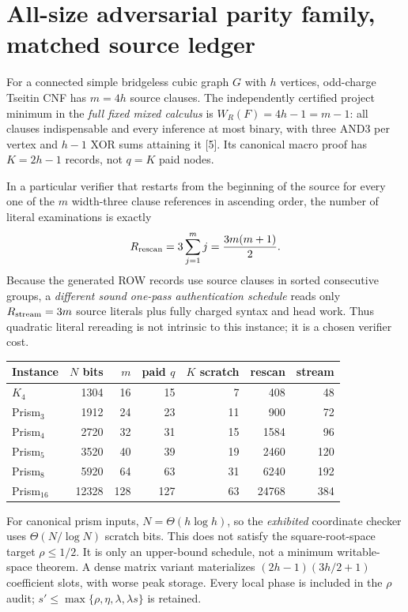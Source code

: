 \documentclass[11pt]{article}
\begin{document}
\section{All-size adversarial parity family, matched source ledger}
For a connected simple bridgeless cubic graph $G$ with $h$ vertices, odd-charge Tseitin CNF has $m=4h$ source clauses. The independently certified project minimum in the \emph{full fixed mixed calculus} is $W_R(F)=4h-1=m-1$: all clauses indispensable and every inference at most binary, with three AND3 per vertex and $h-1$ XOR sums attaining it [5]. Its canonical macro proof has $K=2h-1$ records, not $q=K$ paid nodes.

In a particular verifier that restarts from the beginning of the source for every one of the $m$ width-three clause references in ascending order, the number of literal examinations is exactly
\[
R_{\rm rescan}=3\sum_{j=1}^{m}j=\frac{3m(m+1)}2.
\]
Because the generated ROW records use source clauses in sorted consecutive groups, a \emph{different sound one-pass authentication schedule} reads only $R_{\rm stream}=3m$ source literals plus fully charged syntax and head work. Thus quadratic literal rereading is not intrinsic to this instance; it is a chosen verifier cost.

\begin{center}\small
\begin{tabular}{lrrrrrr}\toprule
Instance & $N$ bits & $m$ & paid $q$ & $K$ scratch & rescan & stream\\\midrule
$K_4$ & 1304 &16&15&7&408&48\\
Prism$_3$ &1912&24&23&11&900&72\\
Prism$_4$ &2720&32&31&15&1584&96\\
Prism$_5$ &3520&40&39&19&2460&120\\
Prism$_8$ &5920&64&63&31&6240&192\\
Prism$_{16}$ &12328&128&127&63&24768&384\\\bottomrule
\end{tabular}
\end{center}
For canonical prism inputs, $N=\Theta(h\log h)$, so the \emph{exhibited} coordinate checker uses $\Theta(N/\log N)$ scratch bits. This does not satisfy the square-root-space target $\rho\le1/2$. It is only an upper-bound schedule, not a minimum writable-space theorem. A dense matrix variant materializes $(2h-1)(3h/2+1)$ coefficient slots, with worse peak storage. Every local phase is included in the $\rho$ audit; $s'\le\max\{\rho,\eta,\lambda,\lambda s\}$ is retained.
\end{document}
